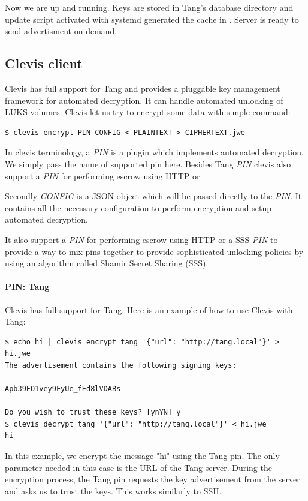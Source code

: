 Now we are up and running.
Keys are stored in Tang's database directory and update script activated with systemd generated the cache in .
Server is ready to send advertisment on demand.



\subsection{Clevis client}\label{clevis}

Clevis has full support for Tang and provides a pluggable key management framework for automated decryption.
It can handle automated unlocking of LUKS volumes.
Clevis let us try to encrypt some data with simple command:
\begin{lstlisting}[columns=fixed,basicstyle=\ttfamily\footnotesize,tabsize=4,backgroundcolor=\color{yellow!10}]
$ clevis encrypt PIN CONFIG < PLAINTEXT > CIPHERTEXT.jwe
\end{lstlisting}
In clevis terminology, a {\it PIN} is a plugin which implements automated decryption.
We simply pass the name of supported pin here.
Besides Tang {\it PIN} clevis also support a {\it PIN} for performing escrow using HTTP or

Secondly {\it CONFIG} is a JSON object which will be passed directly to the {\it PIN}.
It contains all the necessary configuration to perform encryption and setup automated decryption.

It also support a {\it PIN} for performing escrow using HTTP or a SSS {\it PIN} to provide a way to mix pins together to provide sophisticated unlocking policies by using an algorithm called Shamir Secret Sharing (SSS).


\paragraph{PIN: Tang}
Clevis has full support for Tang.
Here is an example of how to use Clevis with Tang:
\begin{lstlisting}[columns=fixed,basicstyle=\ttfamily\footnotesize,tabsize=4,backgroundcolor=\color{yellow!10}]
$ echo hi | clevis encrypt tang '{"url": "http://tang.local"}' > hi.jwe
The advertisement contains the following signing keys:

Apb39FO1vey9FyUe_fEd8lVDABs

Do you wish to trust these keys? [ynYN] y
$ clevis decrypt tang '{"url": "http://tang.local"}' < hi.jwe
hi
\end{lstlisting}
In this example, we encrypt the message "hi" using the Tang pin.
The only parameter needed in this case is the URL of the Tang server.
During the encryption process, the Tang pin requests the key advertisement from the server and asks us to trust the keys.
This works similarly to SSH.

